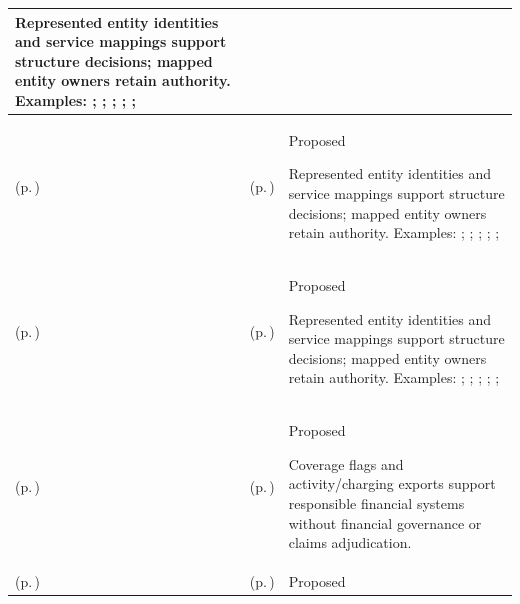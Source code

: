 \begin{longtable}{|>{\raggedright\arraybackslash}p{0.27\TableWidth}|>{\raggedright\arraybackslash}p{0.27\TableWidth}|>{\raggedright\arraybackslash}p{0.46\TableWidth}|}
Represented entity identities and service mappings support structure decisions; mapped entity owners retain authority. Examples: \nameref{function:verify-healthcare-organisation}; \nameref{service:organisation-verification-service}; \nameref{function:govern-organisation-profile}; \nameref{service:organisation-directory-query}; \nameref{function:maintain-organisational-structure}; \nameref{service:organisational-hierarchy-resolution}\\\hline
\nameref{cap:bc-healthcare-organisation-service-structure-management} (p.\,\pageref{cap:bc-healthcare-organisation-service-structure-management}) & \nameref{cap:bec-location-administration} (p.\,\pageref{cap:bec-location-administration}) & Proposed

Represented entity identities and service mappings support structure decisions; mapped entity owners retain authority. Examples: \nameref{function:maintain-healthcare-location}; \nameref{service:location-directory-query}; \nameref{function:maintain-physical-location-hierarchy}; \nameref{service:location-hierarchy-resolution}; \nameref{function:maintain-care-place-definition}; \nameref{service:care-place-specification-lookup}\\\hline
\nameref{cap:bc-healthcare-organisation-service-structure-management} (p.\,\pageref{cap:bc-healthcare-organisation-service-structure-management}) & \nameref{cap:bec-health-service-administration} (p.\,\pageref{cap:bec-health-service-administration}) & Proposed

Represented entity identities and service mappings support structure decisions; mapped entity owners retain authority. Examples: \nameref{function:maintain-healthcare-service-definition}; \nameref{service:healthcare-service-directory-query}; \nameref{function:maintain-service-location-provider-map}; \nameref{service:service-provision-resolution}; \nameref{function:maintain-service-availability}; \nameref{service:service-availability-query}\\\hline
\nameref{cap:bc-financial-commercial-services} (p.\,\pageref{cap:bc-financial-commercial-services}) & \nameref{cap:bec-funding-coverage-administration} (p.\,\pageref{cap:bec-funding-coverage-administration}) & Proposed

Coverage flags and activity/charging exports support responsible financial systems without financial governance or claims adjudication.\\\hline
\nameref{cap:bc-financial-commercial-services} (p.\,\pageref{cap:bc-financial-commercial-services}) & \nameref{cap:bec-clinical-charging-claims-administration} (p.\,\pageref{cap:bec-clinical-charging-claims-administration}) & Proposed


\end{longtable}
